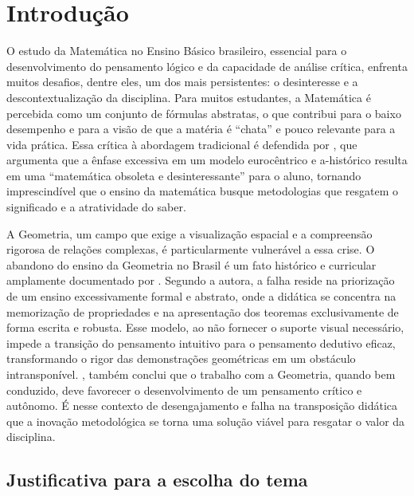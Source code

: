 \chapter{Introdução}\label{cap:introducao}
O estudo da Matemática no Ensino Básico brasileiro, essencial para o desenvolvimento do pensamento lógico e da capacidade de análise crítica, enfrenta muitos desafios, dentre eles, um dos mais persistentes: o desinteresse e a descontextualização da disciplina. Para muitos estudantes, a Matemática é percebida como um conjunto de fórmulas abstratas, o que contribui para o baixo desempenho e para a visão de que a matéria é ``chata'' e pouco relevante para a vida prática. Essa crítica à abordagem tradicional é defendida por , que argumenta que a ênfase excessiva em um modelo eurocêntrico e a-histórico resulta em uma ``matemática obsoleta e desinteressante'' para o aluno, tornando imprescindível que o ensino da matemática busque metodologias que resgatem o significado e a atratividade do saber.

A Geometria, um campo que exige a visualização espacial e a compreensão rigorosa de relações complexas, é particularmente vulnerável a essa crise. O abandono do ensino da Geometria no Brasil é um fato histórico e curricular amplamente documentado por . Segundo a autora, a falha reside na priorização de um ensino excessivamente formal e abstrato, onde a didática se concentra na memorização de propriedades e na apresentação dos teoremas exclusivamente de forma escrita e robusta. Esse modelo, ao não fornecer o suporte visual necessário, impede a transição do pensamento intuitivo para o pensamento dedutivo eficaz, transformando o rigor das demonstrações geométricas em um obstáculo intransponível. , também conclui que o trabalho com a Geometria, quando bem conduzido, deve favorecer o desenvolvimento de um pensamento crítico e autônomo. É nesse contexto de desengajamento e falha na transposição didática que a inovação metodológica se torna uma solução viável para resgatar o valor da disciplina.


\section{Justificativa para a escolha do tema}

